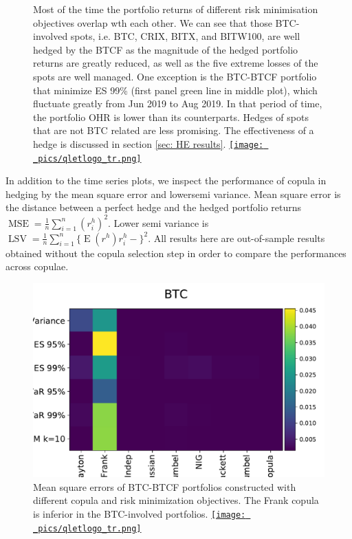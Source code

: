 \begin{figure}[ht]
{            Most of the time the portfolio returns of different risk minimisation objectives overlap wth each other.
            We can see that those BTC-involved spots, i.e. BTC, CRIX, BITX, and BITW100,  are well hedged by the BTCF as the magnitude of the hedged portfolio returns are greatly reduced,
            as well as the five extreme losses of the spots are well managed.
            One exception is the BTC-BTCF portfolio that minimize ES 99\% (first panel green line in middle plot), which fluctuate greatly from Jun 2019 to Aug 2019.
            In that period of time, the portfolio OHR is lower than its counterparts.
            Hedges of spots that are not BTC related are less promising.
            The effectiveness of a hedge is discussed in section \ref{sec: HE results}.
  \href{http://www.quantlet.com/}{\texttt{[image: \_pics/qletlogo\_tr.png]}} }
\label{fig:overview}
\end{figure}

In addition to the time series plots,
we inspect the performance of copula in hedging by the mean square error and lowersemi variance.
Mean square error is the distance between a perfect hedge and the hedged portfolio returns $\operatorname{MSE}=\frac{1}{n}\sum_{i=1}^n(r^h_i)^2$.
Lower semi variance is $\operatorname{LSV}=\frac{1}{n}\sum_{i=1}^n\{\operatorname{E}(r^h)r^h_i-\}^2$.
All results here are out-of-sample results obtained without the copula selection step in order to compare the performances across copulae.  \medskip

\begin{figure}[ht]
    \centering
    \includegraphics[width=\textwidth]{_pics/MSE_BTC.pdf}
  \caption{Mean square errors of BTC-BTCF portfolios constructed with different copula and risk minimization objectives.
    The Frank copula is inferior in the BTC-involved portfolios.
    \href{http://www.quantlet.com/}{\texttt{[image: \_pics/qletlogo\_tr.png]}} }
\label{fig:MSE_BTC}
\end{figure}

